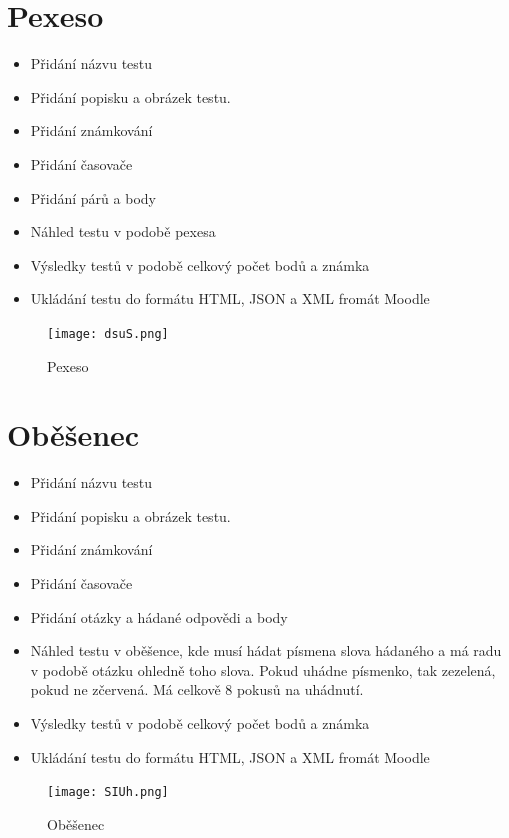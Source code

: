\documentclass[12pt, a4paper, twoside, openright]{report}
\begin{document}
\section{Pexeso}
\begin{itemize}
		\item Přidání názvu testu
		\item Přidání popisku a obrázek testu.
		\item Přidání známkování
		\item Přidání časovače
            \item Přidání párů a body
            \item Náhled testu v podobě pexesa
            \item Výsledky testů v podobě celkový počet bodů a známka
            \item Ukládání testu do formátu HTML, JSON a XML fromát Moodle
	\end{itemize}

    \begin{figure}[h]
		\centering
		\texttt{[image: dsuS.png]}
		\caption{Pexeso}
		\label{fig:architecture}
	\end{figure}


\section{Oběšenec}
\begin{itemize}
		\item Přidání názvu testu
		\item Přidání popisku a obrázek testu.
		\item Přidání známkování
		\item Přidání časovače
            \item Přidání otázky a hádané odpovědi a body
            \item Náhled testu v oběšence, kde musí hádat písmena slova hádaného a má radu v podobě otázku
            ohledně toho slova. Pokud uhádne písmenko, tak zezelená, pokud ne zčervená. Má celkově 8 pokusů na uhádnutí.
            \item Výsledky testů v podobě celkový počet bodů a známka
            \item Ukládání testu do formátu HTML, JSON a XML fromát Moodle
	\end{itemize}

    \begin{figure}[h]
		\centering
		\texttt{[image: SIUh.png]}
		\caption{Oběšenec}
		\label{fig:architecture}
	\end{figure}
\end{document}
